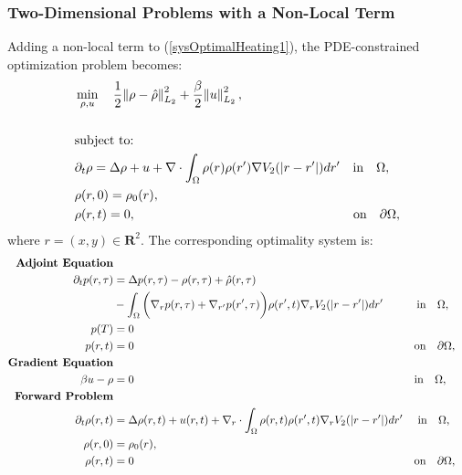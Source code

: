 \subsubsection{Two-Dimensional Problems with a Non-Local Term}
Adding a non-local term to (\ref{sysOptimalHeating1}), the PDE-constrained optimization problem becomes:
\begin{align*}
&\min_{\rho,u} \quad \frac{1}{2}\norm{\rho- \hat{\rho}}_{L_2}^2 + \frac{\beta}{2} \norm{u}_{L_2}^2,\\
\\
&\text{subject to:}\\
&\partial_t \rho = \Delta \rho + {u} + \nabla \cdot \int_\Omega \rho(r) \rho(r') \nabla V_2(|r-r'|)dr'  \quad \text{in} \quad \Omega,
\\
&\rho(r,0)=\rho_0(r),
\\
& \rho(r,t)=0, \quad\quad\quad\quad\quad\quad\quad\quad\quad\quad\quad\quad\quad\quad\quad\quad \quad  \text{on} \quad \partial \Omega,
\end{align*}
where $r=(x,y) \in \mathbf{R}^2$.
The corresponding optimality system is:
\begin{align*}
\textbf{Adjoint Equation}  \\
\partial_t p(r,\tau) &= \Delta p(r,\tau) -\rho(r,\tau) +\hat{\rho}(r,\tau)\\
&-\int_\Omega \bigg( \nabla_r p(r,\tau) + \nabla_{r'} p(r',\tau) \bigg) \rho(r',t) \nabla_r V_2(|r-r'|)dr'  \quad\quad\quad   \text{in} \quad \Omega,\\
p(T) &= 0 \notag\\
p(r,t) &=0 \quad \quad \quad  \quad\quad\quad\quad\quad\quad\quad\quad\quad\quad\quad\quad\quad\quad\quad\quad\quad\quad\quad\quad \quad\ \ \ \text{on}\quad \partial\Omega, \notag\\
\textbf{Gradient Equation} \notag \\
\beta u  - \rho  &=0 \quad\quad\quad\quad \quad\quad\quad\quad\quad\quad\quad\quad\quad\quad\quad\quad\quad\quad\quad\quad\quad\quad\quad\quad\quad\text{in} \quad \Omega, \notag \\
\textbf{Forward Problem} \notag \\
\partial_t \rho(r,t) &= \Delta \rho(r,t) + u(r,t)+  \nabla_r \cdot \int_\Omega \rho(r,t) \rho(r',t) \nabla_r V_2(|r-r'|)dr' \quad \ \text{in} \quad \Omega,\\  
\rho(r,0)&=\rho_0(r), \notag \\
\rho(r,t) &=0 \quad\quad\quad \quad\quad\quad\quad\quad\quad\quad\quad\quad\quad\quad\quad\quad\quad \quad\quad\quad\quad\quad\quad\quad \ \ \ \text{on} \quad \partial \Omega, \notag
\end{align*}

